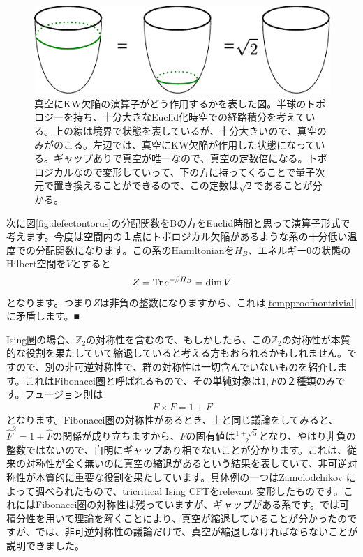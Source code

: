 \documentclass[report,paper=a4, fontsize=12pt, line_length=16cm, number_of_lines=33,dvipdfmx]{jlreq}
\newcommand{\qed}{■}
\numberwithin{equation}{chapter}
\newcommand{\Zb}{\mathbb{Z}}
\begin{document}
\begin{figure}
  \centering
  \includegraphics{KWonvacuum.pdf}
  \caption{真空にKW欠陥の演算子がどう作用するかを表した図。半球のトポロジーを持ち、十分大きなEuclid化時空での経路積分を考えている。上の線は境界で状態を表しているが、十分大きいので、真空のみがのこる。左辺では、真空にKW欠陥が作用した状態になっている。ギャップありで真空が唯一なので、真空の定数倍になる。トポロジカルなので変形していって、下の方に持ってくることで量子次元で置き換えることができるので、この定数は$\sqrt{2}$であることが分かる。}
  \label{fig:KWonvacuum}
\end{figure}

次に図\ref{fig:defectontorus}の分配関数をBの方をEuclid時間と思って演算子形式で考えます。今度は空間内の１点にトポロジカル欠陥があるような系の十分低い温度での分配関数になります。この系のHamiltonianを$H_B$、エネルギー$0$の状態のHilbert空間を$V$とすると
\begin{align}
  Z=\Tr e^{-\beta H_B}=\dim V
\end{align}
となります。つまり$Z$は非負の整数になりますから、これは\eqref{tempproofnontrivial}に矛盾します。\qed

Ising圏の場合、$\Zb_2$の対称性を含むので、もしかしたら、この$\Zb_2$の対称性が本質的な役割を果たしていて縮退していると考える方もおられるかもしれません。ですので、別の非可逆対称性で、群の対称性は一切含んでいないものを紹介します。これはFibonacci圏と呼ばれるもので、その単純対象は$1,F$の２種類のみです。フュージョン則は
\begin{align}
  F\times F =1 + F
\end{align}
となります。Fibonacci圏の対称性があるとき、上と同じ議論をしてみると、$\widehat{F}^2=1+\widehat{F}$の関係が成り立ちますから、$\widehat{F}$の固有値は$\frac{1\pm \sqrt{5}}{2}$となり、やはり非負の整数ではないので、自明にギャップあり相でないことが分かります。これは、従来の対称性が全く無いのに真空の縮退があるという結果を表していて、非可逆対称性が本質的に重要な役割を果たしています。具体例の一つはZamolodchikov \cite{Zamolodchikov:1990xc}によって調べられたもので、tricritical Ising CFTをrelevant 変形したものです。これにはFibonacci圏の対称性は残っていますが、ギャップがある系です。\cite{Zamolodchikov:1990xc}では可積分性を用いて理論を解くことにより、真空が縮退していることが分かったのですが、\cite{Chang:2018iay}では、非可逆対称性の議論だけで、真空が縮退しなければならないことが説明できました。
\end{document}
